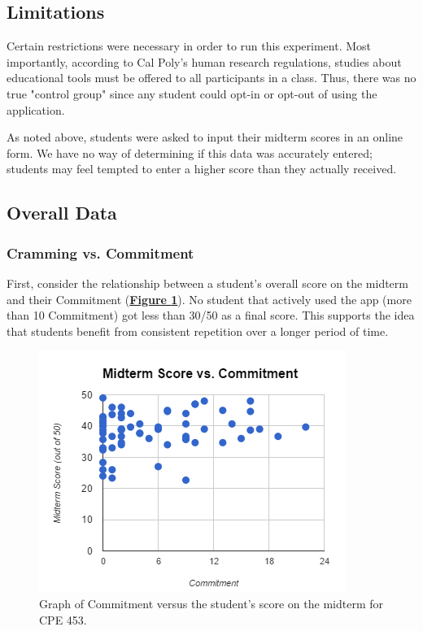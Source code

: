 \subsection{Limitations}
\par Certain restrictions were necessary in order to run this experiment. Most importantly, according to Cal Poly's human research regulations, studies about educational tools must be offered to all participants in a class. Thus, there was no true "control group" since any student could opt-in or opt-out of using the application.

\par As noted above, students were asked to input their midterm scores in an online form. We have no way of determining if this data was accurately entered; students may feel tempted to enter a higher score than they actually received.

\subsection{Overall Data}
\subsubsection{Cramming vs. Commitment}
\par First, consider the relationship between a student's overall score on the midterm and their Commitment (\textbf{\hyperref[fig:comm_vs_score]{Figure \ref*{fig:comm_vs_score}}}). No student that actively used the app (more than 10 Commitment) got less than 30/50 as a final score. This supports the idea that students benefit from consistent repetition over a longer period of time.
 
 \par 
 
 \begin{figure}[ht]
 	\includegraphics{figures/commitment-data1}
 	\caption{Graph of Commitment versus the student's score on the midterm for CPE 453.}
 	\label{fig:comm_vs_score}
 \end{figure}


